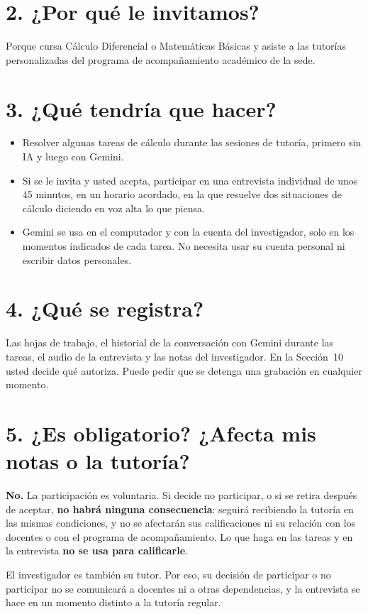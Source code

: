 \documentclass[11pt,letterpaper]{article}
\begin{document}
\section*{2. ¿Por qué le invitamos?}
Porque cursa Cálculo Diferencial o Matemáticas Básicas y asiste a las tutorías personalizadas del programa de acompañamiento académico de la sede.

\section*{3. ¿Qué tendría que hacer?}
\begin{itemize}
  \item Resolver algunas tareas de cálculo durante las sesiones de tutoría, primero sin IA y luego con Gemini.
  \item Si se le invita y usted acepta, participar en una entrevista individual de unos 45 minutos, en un horario acordado, en la que resuelve dos situaciones de cálculo diciendo en voz alta lo que piensa.
  \item Gemini se usa en el computador y con la cuenta del investigador, solo en los momentos indicados de cada tarea. No necesita usar su cuenta personal ni escribir datos personales.
\end{itemize}

\section*{4. ¿Qué se registra?}
Las hojas de trabajo, el historial de la conversación con Gemini durante las tareas, el audio de la entrevista y las notas del investigador. En la Sección~10 usted decide qué autoriza. Puede pedir que se detenga una grabación en cualquier momento.

\section*{5. ¿Es obligatorio? ¿Afecta mis notas o la tutoría?}
\textbf{No.} La participación es voluntaria. Si decide no participar, o si se retira después de aceptar, \textbf{no habrá ninguna consecuencia}: seguirá recibiendo la tutoría en las mismas condiciones, y no se afectarán sus calificaciones ni su relación con los docentes o con el programa de acompañamiento. Lo que haga en las tareas y en la entrevista \textbf{no se usa para calificarle}.

El investigador es también su tutor. Por eso, su decisión de participar o no participar no se comunicará a docentes ni a otras dependencias, y la entrevista se hace en un momento distinto a la tutoría regular.
\end{document}
